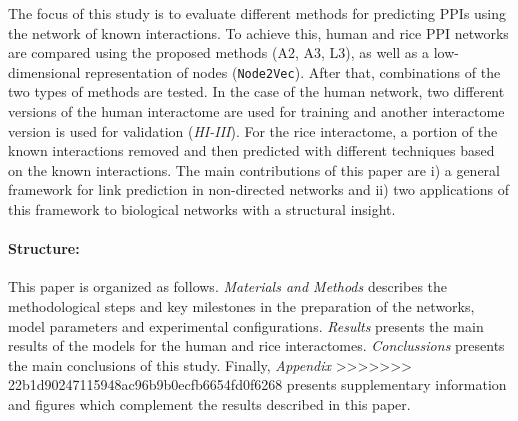 The focus of this study is to evaluate different methods for predicting
PPIs using the network of known interactions. To achieve this, human
and rice PPI networks are compared using the proposed methods (A2,
A3, L3), as well as a low-dimensional representation of nodes (\texttt{Node2Vec})\cite{Grover_2016}.
After that, combinations of the two types of methods are tested. In
the case of the human network, two different versions of the human
interactome \cite{Rolland2014Human} are used for training and another
interactome version is used for validation (\emph{HI-III})\cite{Kovacs2019}.
For the rice interactome, a portion of the known interactions removed
and then predicted with different techniques based on the known interactions.
The main contributions of this paper are i) a general framework for
link prediction in non-directed networks and ii) two applications
of this framework to biological networks with a structural insight.

\paragraph*{Structure:} This paper is organized as follows. \emph{Materials and Methods} describes
the methodological steps and key milestones in the preparation of
the networks, model parameters and experimental configurations.
\emph{Results} presents the main results of the models for the human and rice interactomes.
\emph{Conclussions} presents the main conclusions of this study. Finally, \emph{Appendix}
>>>>>>> 22b1d90247115948ac96b9b0ecfb6654fd0f6268
presents supplementary information and figures which complement the
results described in this paper.